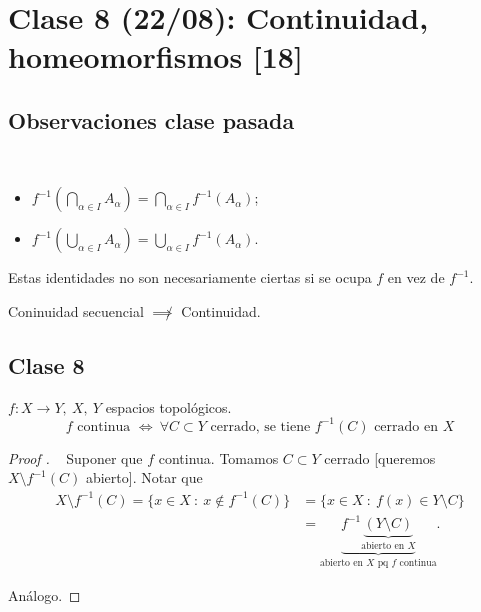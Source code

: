 \documentclass[a4paper]{report}
\begin{document}

	\section{Clase 8 (22/08): Continuidad, homeomorfismos [18]}

	\subsection{Observaciones clase pasada}

	\begin{remark}~
		\begin{itemize}
			\item $f^{-1}\left( \displaystyle\bigcap_{\alpha\in I} A_{\alpha} \right) = \displaystyle\bigcap_{\alpha\in I} f^{-1}(A_{\alpha})$;

			\item $f^{-1}\left( \displaystyle\bigcup_{\alpha \in I} A_{\alpha} \right) = \displaystyle\bigcup_{\alpha \in I} f^{-1}(A_{\alpha})$.
		\end{itemize}
		\noindent Estas identidades no son necesariamente ciertas si se ocupa $f$ en vez de $f^{-1}$.
	\end{remark}

	\begin{remark}[Tarea 2]
		Coninuidad secuencial $\not\implies$ Continuidad.
	\end{remark}

	\subsection{Clase 8}

	\begin{lemma}
		$f:X\to Y,\ X,\ Y$ espacios topológicos.
		\[ f \text{ continua } \iff \ \forall C \subset Y \text{ cerrado, se tiene } f^{-1}(C) \text{ cerrado en } X \]
	\end{lemma}
	\begin{proof}[Proof ]~
		\Onlyifstep Suponer que $f$ continua. Tomamos $C \subset Y$ cerrado [queremos $X\setminus f^{-1}(C)$ abierto]. Notar que
		\begin{align*}
			X\setminus f^{-1}(C) = \{ x \in X \ : \ x \not\in f^{-1}(C) \} & = \{ x \in X \ : \ f(x) \in Y\setminus C \} \\
			& = \underbrace{f^{-1}\underbrace{(Y\setminus C)}_{\text{abierto en } X}}_{\text{abierto en } X \text{ pq } f \text{ continua}}
		.\end{align*}
		
		\noindent \Ifstep Análogo.
	\end{proof}
\end{document}
